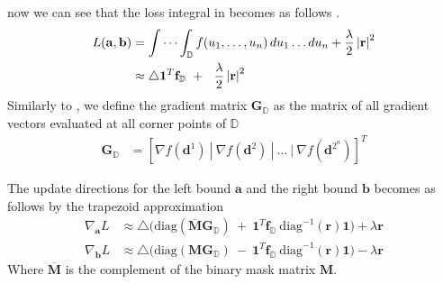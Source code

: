 now we can see that the loss integral in \eqLabel{\ref{eq:trapezoidal-integration2}} becomes as follows .
\begin{equation}
\begin{aligned} 
L(\mathbf{a},\mathbf{b}) &= \idotsint_\mathbb{D} f(u_1,\dots,u_n) \,du_1 \dots du_n + \frac{\lambda}{2} \left| \mathbf{r}\right|^{2} \\ 
&\approx \triangle \mathbf{1}^{T}\mathbf{f}_{\mathbb{D}} ~+~~ \frac{\lambda}{2} \left| \mathbf{r}\right|^{2}
\label{eq:n-loss-trap}
\end{aligned}
\end{equation}
Similarly to \eqLabel{\ref{eq:n-function-sup}}, we define the gradient matrix $\mathbf{G}_{\mathbb{D}}$ as the matrix of all gradient vectors evaluated at all corner points of $\mathbb{D}$
\begin{equation}
\begin{aligned} 
\mathbf{G}_{\mathbb{D}} &= \left[\nabla f(\mathbf{d}^{1})~|~\nabla f(\mathbf{d}^{2})~|~...~|~\nabla f(\mathbf{d}^{2^{n}}) \right]^{T} 
\label{eq:n-gradient-sup}
\end{aligned}
\end{equation}

The update directions for the left bound $\mathbf{a}$ and the right bound $\mathbf{b}$ becomes as follows by the trapezoid approximation
\begin{equation}
\begin{aligned} 
\nabla_{\mathbf{a}}L  &\approx \triangle \Big(\text{diag}(\overline{\mathbf{M}}\mathbf{G}_{\mathbb{D}}) ~+~ \mathbf{1}^{T}\mathbf{f}_{\mathbb{D}} ~\text{diag}^{-1}(\mathbf{r})\mathbf{1}  \Big)+ \lambda \mathbf{r} \\
\nabla_{\mathbf{b}}L  &\approx \triangle \Big(\text{diag}(\mathbf{M}\mathbf{G}_{\mathbb{D}}) ~-~ \mathbf{1}^{T}\mathbf{f}_{\mathbb{D}} ~\text{diag}^{-1}(\mathbf{r})\mathbf{1}  \Big) - \lambda \mathbf{r}
\label{eq:n-update-trap}
\end{aligned}
\end{equation}
Where $\overline{\mathbf{M}}$ is the complement of the binary mask matrix $\mathbf{M}$.



